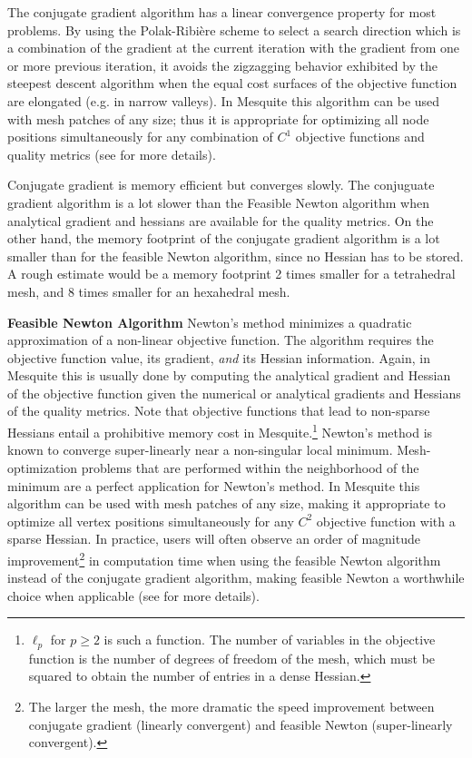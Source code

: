 The conjugate gradient algorithm
has a linear convergence property for most problems. By using the
Polak-Ribi\`ere scheme to select a search direction which is a
combination of the gradient at the current iteration with the gradient
from one or more previous iteration, it avoids the zigzagging behavior
exhibited by the steepest descent algorithm when the equal cost
surfaces of the objective function are elongated (e.g. in narrow
valleys). In Mesquite this algorithm can be used with mesh patches of
any size; thus it is appropriate for optimizing all node positions 
simultaneously for any combination of $C^1$ objective functions and
quality metrics (see \cite{FeasNewt} for more details). 

Conjugate gradient is memory efficient but converges slowly.
The conjuguate gradient algorithm is a lot slower than the Feasible Newton algorithm
when analytical gradient and hessians are available for the quality metrics. On the other hand, the
memory footprint of the conjugate gradient algorithm is a lot smaller than for the feasible Newton 
algorithm, since no Hessian has to be stored. A rough estimate would be a memory 
footprint 2 times smaller for a tetrahedral mesh, and 8 times smaller for an hexahedral mesh.  
\newline

{\bf Feasible Newton Algorithm } \newline
\label{append_feasnewt}
Newton's method minimizes a quadratic
approximation of a non-linear objective function. The algorithm requires
the objective function value, its gradient, \emph{and} its Hessian information.
Again, in Mesquite this
is usually done by computing the analytical gradient and Hessian of
the objective function given the numerical or analytical gradients and
Hessians of the quality metrics.  Note that objective functions that
lead to non-sparse Hessians entail a prohibitive memory cost in
Mesquite.\footnote{$\ell_p$ for $p \geq 2$ is such a function. The
number of variables in the objective function is the number of degrees
of freedom of the mesh, which must be squared to obtain the number of
entries in a dense Hessian.}  Newton's method is known to converge
super-linearly near a non-singular local minimum.   
Mesh-optimization problems that are performed within the neighborhood of
the minimum are a perfect application for Newton's method. In
Mesquite this algorithm can be used with mesh patches of any size,
making it appropriate to optimize all vertex positions simultaneously
for any $C^2$ objective function with a sparse Hessian.  In practice,
users will often observe an order of magnitude improvement\footnote{The larger the mesh, the
more dramatic the speed improvement between conjugate gradient (linearly convergent) and feasible
Newton (super-linearly convergent).} in
computation time when using the feasible Newton algorithm instead of
the conjugate gradient algorithm, making feasible Newton a worthwhile
choice when applicable (see \cite{FeasNewt} for more details). \newline

